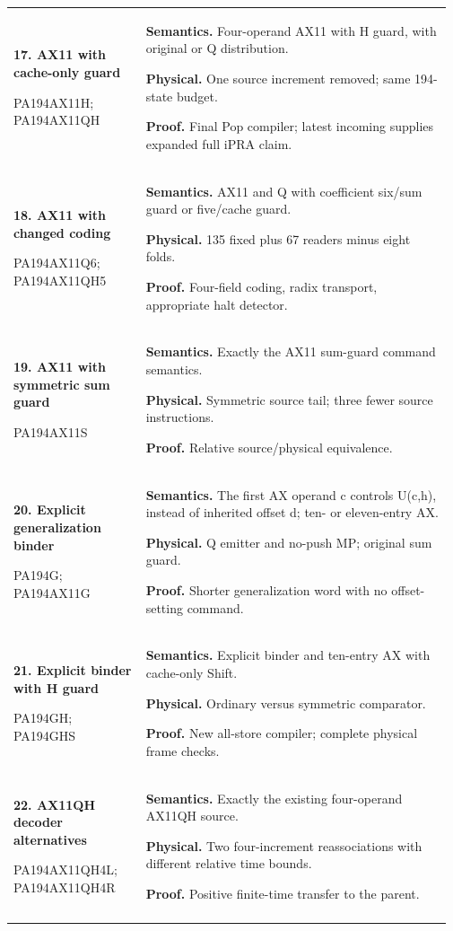 \begin{longtable}{@{}>{\raggedright\arraybackslash}p{0.295\linewidth}>{\raggedright\arraybackslash}p{0.675\linewidth}@{}}
\textbf{17. AX11 with cache-only guard}\par PA194AX11H; PA194AX11QH & \textbf{Semantics.} Four-operand AX11 with H guard, with original or Q distribution.\par\textbf{Physical.} One source increment removed; same 194-state budget.\par\textbf{Proof.} Final Pop compiler; latest incoming supplies expanded full iPRA claim.\\\addlinespace[6pt]
\textbf{18. AX11 with changed coding}\par PA194AX11Q6; PA194AX11QH5 & \textbf{Semantics.} AX11 and Q with coefficient six/sum guard or five/cache guard.\par\textbf{Physical.} 135 fixed plus 67 readers minus eight folds.\par\textbf{Proof.} Four-field coding, radix transport, appropriate halt detector.\\\addlinespace[6pt]
\textbf{19. AX11 with symmetric sum guard}\par PA194AX11S & \textbf{Semantics.} Exactly the AX11 sum-guard command semantics.\par\textbf{Physical.} Symmetric source tail; three fewer source instructions.\par\textbf{Proof.} Relative source/physical equivalence.\\\addlinespace[6pt]
\textbf{20. Explicit generalization binder}\par PA194G; PA194AX11G & \textbf{Semantics.} The first AX operand c controls U(c,h), instead of inherited offset d; ten- or eleven-entry AX.\par\textbf{Physical.} Q emitter and no-push MP; original sum guard.\par\textbf{Proof.} Shorter generalization word with no offset-setting command.\\\addlinespace[6pt]
\textbf{21. Explicit binder with H guard}\par PA194GH; PA194GHS & \textbf{Semantics.} Explicit binder and ten-entry AX with cache-only Shift.\par\textbf{Physical.} Ordinary versus symmetric comparator.\par\textbf{Proof.} New all-store compiler; complete physical frame checks.\\\addlinespace[6pt]
\textbf{22. AX11QH decoder alternatives}\par PA194AX11QH4L; PA194AX11QH4R & \textbf{Semantics.} Exactly the existing four-operand AX11QH source.\par\textbf{Physical.} Two four-increment reassociations with different relative time bounds.\par\textbf{Proof.} Positive finite-time transfer to the parent.\\\addlinespace[6pt]

\end{longtable}
